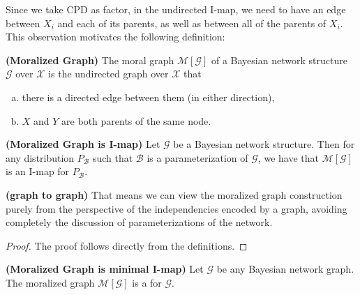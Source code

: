 \documentclass{article}
\newcommand{\bfs}[1]{\textbf{({#1}) }}
\begin{document}
Since we take CPD as factor, in the undirected I-map, we need to have an edge between $X_{i}$ and each of its parents, as well as between all of the parents of $X_{i}$. This observation motivates the following definition:
\begin{defa}\bfs{Moralized Graph}
The moral graph $\mathcal{M}[\mathcal{G}]$ of a Bayesian network structure $\mathcal{G}$ over $\mathcal{X}$ is the undirected graph over $\mathcal{X}$ that 
\begin{enumerate}[(a)]
    \item there is a directed edge between them (in either direction), 
    \item $X$ and $Y$ are both parents of the same node.
\end{enumerate}
\end{defa}
\begin{lema}\bfs{Moralized Graph is I-map}
 Let $\mathcal{G}$ be a Bayesian network structure. Then for any distribution $P_{\mathcal{B}}$ such that $\mathcal{B}$ is a parameterization of $\mathcal{G}$, we have that $\mathcal{M}[\mathcal{G}]$ is an I-map for $P_{\mathcal{B}}$.
\end{lema}
\begin{rema}\bfs{graph to graph}
 That means we can view the moralized graph construction purely from the perspective of the independencies encoded by a graph, avoiding completely the discussion of parameterizations of the network.
\end{rema}
\begin{proof}
The proof follows directly from the definitions.
\end{proof}
\begin{thma}\bfs{Moralized Graph is minimal I-map}
Let $\mathcal{G}$ be any Bayesian network graph. The moralized graph $\mathcal{M}[\mathcal{G}]$ is a  for $\mathcal{G}$.
\end{thma}
\end{document}
